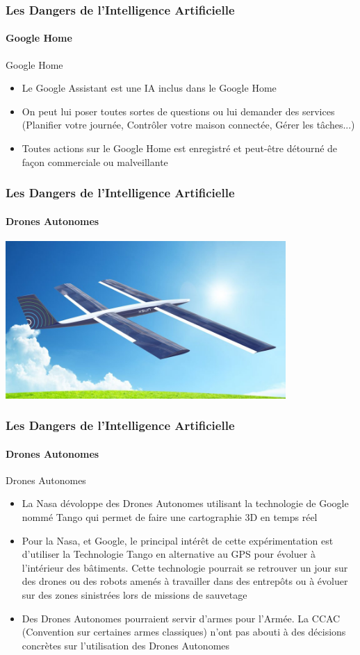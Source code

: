 \documentclass{beamer}
\begin{document}
	\begin{frame}
	\frametitle{Les Dangers de l'Intelligence Artificielle}
	\framesubtitle{Google Home}
	\begin{block}{Google Home}
	\begin{itemize}
	\itemsep1em
		\item Le Google Assistant est une IA inclus dans le Google Home
		\item On peut lui poser toutes sortes de questions ou lui demander des services (Planifier votre journée, Contrôler votre maison connectée, Gérer les tâches...)
		\item Toutes actions sur le Google Home est enregistré et peut-être détourné de façon commerciale ou malveillante
	\end{itemize}
	\end{block}
	\end{frame}
	
	\begin{frame}
	\frametitle{Les Dangers de l'Intelligence Artificielle}
	\framesubtitle{Drones Autonomes}
	\centerline{\includegraphics[height=6cm]{drone.jpg}}
	\end{frame}
	
	\begin{frame}
	\frametitle{Les Dangers de l'Intelligence Artificielle}
	\framesubtitle{Drones Autonomes}
	\begin{block}{Drones Autonomes}
	\begin{itemize}
	\itemsep1em
		\item La Nasa dévoloppe des Drones Autonomes utilisant la technologie de Google nommé Tango qui permet de faire une cartographie 3D en temps réel
		\item Pour la Nasa, et Google, le principal intérêt de cette expérimentation est d'utiliser la Technologie Tango en alternative au GPS pour évoluer à l'intérieur des bâtiments. Cette technologie pourrait se retrouver un jour sur des drones ou des robots amenés à travailler dans des entrepôts ou à évoluer sur des zones sinistrées lors de missions de sauvetage
		\item Des Drones Autonomes pourraient servir d'armes pour l'Armée. La CCAC (Convention sur certaines armes classiques) n'ont pas abouti à des décisions concrètes sur l'utilisation des Drones Autonomes
	\end{itemize}
	\end{block}
	\end{frame}
	
\end{document}
